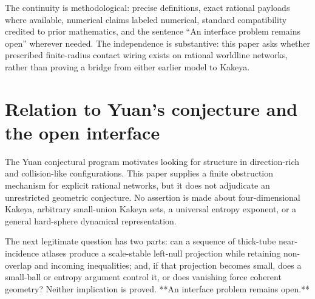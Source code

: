 \documentclass[11pt]{article}
\theoremstyle{definition}
\theoremstyle{remark}
\begin{document}
The continuity is methodological: precise definitions, exact rational payloads where available, numerical claims labeled numerical, standard compatibility credited to prior mathematics, and the sentence ``An interface problem remains open'' wherever needed. The independence is substantive: this paper asks whether prescribed finite-radius contact wiring exists on rational worldline networks, rather than proving a bridge from either earlier model to Kakeya.

\section{Relation to Yuan's conjecture and the open interface}

The Yuan conjectural program motivates looking for structure in direction-rich and collision-like configurations. This paper supplies a finite obstruction mechanism for explicit rational networks, but it does not adjudicate an unrestricted geometric conjecture. No assertion is made about four-dimensional Kakeya, arbitrary small-union Kakeya sets, a universal entropy exponent, or a general hard-sphere dynamical representation.

The next legitimate question has two parts: can a sequence of thick-tube near-incidence atlases produce a scale-stable left-null projection while retaining non-overlap and incoming inequalities; and, if that projection becomes small, does a small-ball or entropy argument control it, or does vanishing force coherent geometry? Neither implication is proved. **An interface problem remains open.**
\end{document}
